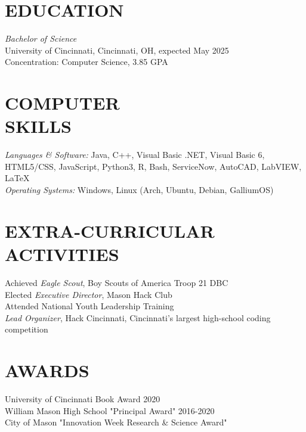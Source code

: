 \documentclass[margin, 10pt]{res} %
\begin{document}
\begin{resume}

\section{EDUCATION}

{\sl Bachelor of Science}\\
University of Cincinnati, Cincinnati, OH, expected May 2025 \\
Concentration: Computer Science, 3.85 GPA


\section{COMPUTER \\ SKILLS} 

{\sl Languages \& Software:} 
Java, C++, Visual Basic .NET, Visual Basic 6, HTML5/CSS, JavaScript, Python3, R, Bash, ServiceNow, AutoCAD, LabVIEW, \LaTeX{} \\
{\sl Operating Systems:} Windows, Linux (Arch, Ubuntu, Debian, GalliumOS)


\section{EXTRA-CURRICULAR \\ ACTIVITIES} 

Achieved {\it Eagle Scout}, Boy Scouts of America Troop 21 DBC \\
Elected {\it Executive Director}, Mason Hack Club \\
Attended National Youth Leadership Training \\
{\it Lead Organizer}, Hack Cincinnati, Cincinnati's largest high-school coding competition


\section{AWARDS}

University of Cincinnati Book Award 2020 \\
William Mason High School "Principal Award" 2016-2020 \\
City of Mason "Innovation Week Research \& Science Award"


\end{resume}
\end{document}
